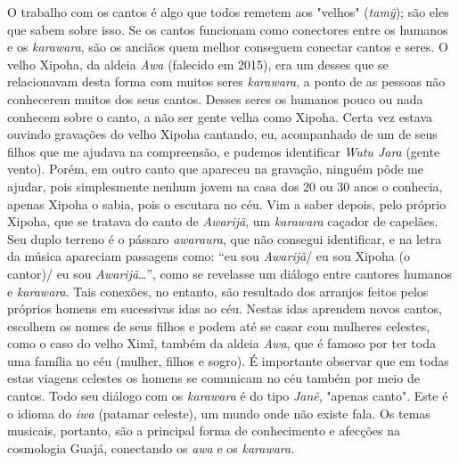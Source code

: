 O trabalho com os cantos é algo que todos remetem aos "velhos"
(\emph{tamỹ}); são eles que sabem sobre isso. Se os cantos funcionam
como conectores entre os humanos e os \emph{karawara}, são os anciãos
quem melhor conseguem conectar cantos e seres. O velho Xipoha, da aldeia
\emph{Awa} (falecido em 2015), era um desses que se relacionavam desta
forma com muitos seres \emph{karawara}, a ponto de as pessoas não
conhecerem muitos dos seus cantos. Desses seres os humanos pouco ou nada
conhecem sobre o canto, a não ser gente velha como Xipoha. Certa vez
estava ouvindo gravações do velho Xipoha cantando, eu, acompanhado de um
de seus filhos que me ajudava na compreensão, e pudemos identificar
\emph{Wutu Jara} (gente vento). Porém, em outro canto que apareceu na
gravação, ninguém pôde me ajudar, pois simplesmente nenhum jovem na casa
dos 20 ou 30 anos o conhecia, apenas Xipoha o sabia, pois o escutara no
céu. Vim a saber depois, pelo próprio Xipoha, que se tratava do canto de
\emph{Awarijã}, um \emph{karawara} caçador de capelães. Seu duplo
terreno é o pássaro \emph{awaraura}, que não consegui identificar, e na
letra da música apareciam passagens como: ``eu sou \emph{Awarijã}/ eu
sou Xipoha (o cantor)/ eu sou \emph{Awarijã}\ldots{}'', como se revelasse um
diálogo entre cantores humanos e \emph{karawara}. Tais conexões, no
entanto, são resultado dos arranjos feitos pelos próprios homens em
sucessivas idas ao céu. Nestas idas aprendem novos cantos, escolhem os
nomes de seus filhos e podem até se casar com mulheres celestes, como o
caso do velho Ximĩ, também da aldeia \emph{Awa}, que é famoso por ter
toda uma família no céu (mulher, filhos e sogro). É importante observar
que em todas estas viagens celestes os homens se comunicam no céu também
por meio de cantos. Todo seu diálogo com os \emph{karawara} é do tipo
\emph{Janẽ}, "apenas canto". Este é o idioma do \emph{iwa} (patamar
celeste), um mundo onde não existe fala. Os temas musicais, portanto,
são a principal forma de conhecimento e afecções na cosmologia Guajá,
conectando os \emph{awa} e os \emph{karawara}.

